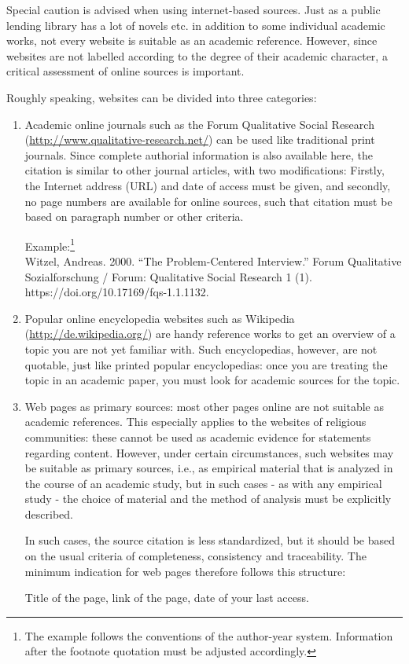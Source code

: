 \documentclass[
  english,
]{scrreprt}
\begin{document}
Special caution is advised when using internet-based sources. Just as a public lending library has a lot of novels etc. in addition to some individual academic works, not every website is suitable as an academic reference. However, since websites are not labelled according to the degree of their academic character, a critical assessment of online sources is important.

Roughly speaking, websites can be divided into three categories:

\begin{enumerate}
\def\labelenumi{\arabic{enumi}.}
\item
  Academic online journals such as the Forum Qualitative Social Research (\url{http://www.qualitative-research.net/}) can be used like traditional print journals. Since complete authorial information is also available here, the citation is similar to other journal articles, with two modifications: Firstly, the Internet address (URL) and date of access must be given, and secondly, no page numbers are available for online sources, such that citation must be based on paragraph number or other criteria.

  Example:\footnote{The example follows the conventions of the author-year system. Information after the footnote quotation must be adjusted accordingly.}\\
  Witzel, Andreas. 2000. “The Problem-Centered Interview.” Forum Qualitative Sozialforschung / Forum: Qualitative Social Research 1 (1). https://doi.org/10.17169/fqs-1.1.1132.
\item
  Popular online encyclopedia websites such as Wikipedia (\url{http://de.wikipedia.org/}) are handy reference works to get an overview of a topic you are not yet familiar with. Such encyclopedias, however, are not quotable, just like printed popular encyclopedias: once you are treating the topic in an academic paper, you must look for academic sources for the topic.
\item
  Web pages as primary sources: most other pages online are not suitable as academic references. This especially applies to the websites of religious communities: these cannot be used as academic evidence for statements regarding content. However, under certain circumstances, such websites may be suitable as primary sources, i.e., as empirical material that is analyzed in the course of an academic study, but in such cases - as with any empirical study - the choice of material and the method of analysis must be explicitly described.

  In such cases, the source citation is less standardized, but it should be based on the usual criteria of completeness, consistency and traceability. The minimum indication for web pages therefore follows this structure:

  Title of the page, link of the page, date of your last access.
\end{enumerate}
\end{document}
